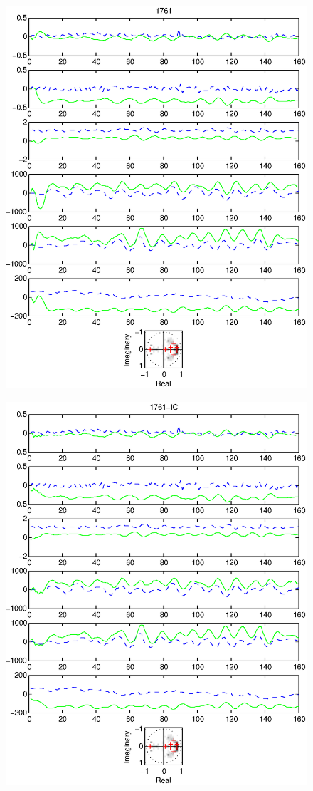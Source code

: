 \documentclass{article}
\begin{document}
\begin{figure}[htb!]
\centering
\includegraphics{1761.eps}
\end{figure}\clearpage
\begin{figure}[htb!]
\centering
\includegraphics{1761_ic.eps}
\end{figure}\clearpage
\end{document}

